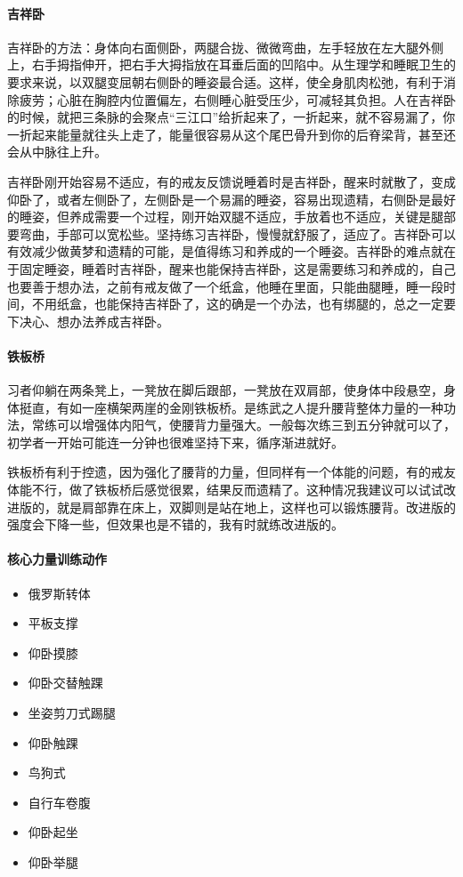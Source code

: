 \paragraph{吉祥卧}

吉祥卧的方法：身体向右面侧卧，两腿合拢、微微弯曲，左手轻放在左大腿外侧上，右手拇指伸开，把右手大拇指放在耳垂后面的凹陷中。从生理学和睡眠卫生的要求来说，以双腿变屈朝右侧卧的睡姿最合适。这样，使全身肌肉松弛，有利于消除疲劳；心脏在胸腔内位置偏左，右侧睡心脏受压少，可减轻其负担。人在吉祥卧的时候，就把三条脉的会聚点“三江口”给折起来了，一折起来，就不容易漏了，你一折起来能量就往头上走了，能量很容易从这个尾巴骨升到你的后脊梁背，甚至还会从中脉往上升。

吉祥卧刚开始容易不适应，有的戒友反馈说睡着时是吉祥卧，醒来时就散了，变成仰卧了，或者左侧卧了，左侧卧是一个易漏的睡姿，容易出现遗精，右侧卧是最好的睡姿，但养成需要一个过程，刚开始双腿不适应，手放着也不适应，关键是腿部要弯曲，手部可以宽松些。坚持练习吉祥卧，慢慢就舒服了，适应了。吉祥卧可以有效减少做黄梦和遗精的可能，是值得练习和养成的一个睡姿。吉祥卧的难点就在于固定睡姿，睡着时吉祥卧，醒来也能保持吉祥卧，这是需要练习和养成的，自己也要善于想办法，之前有戒友做了一个纸盒，他睡在里面，只能曲腿睡，睡一段时间，不用纸盒，也能保持吉祥卧了，这的确是一个办法，也有绑腿的，总之一定要下决心、想办法养成吉祥卧。

\paragraph{铁板桥}

习者仰躺在两条凳上，一凳放在脚后跟部，一凳放在双肩部，使身体中段悬空，身体挺直，有如一座横架两崖的金刚铁板桥。是练武之人提升腰背整体力量的一种功法，常练可以增强体内阳气，使腰背力量强大。一般每次练三到五分钟就可以了，初学者一开始可能连一分钟也很难坚持下来，循序渐进就好。

铁板桥有利于控遗，因为强化了腰背的力量，但同样有一个体能的问题，有的戒友体能不行，做了铁板桥后感觉很累，结果反而遗精了。这种情况我建议可以试试改进版的，就是肩部靠在床上，双脚则是站在地上，这样也可以锻炼腰背。改进版的强度会下降一些，但效果也是不错的，我有时就练改进版的。

\paragraph{核心力量训练动作}

\begin{multicols}{3}
    \begin{itemize}
        \item 俄罗斯转体
        \item 平板支撑
        \item 仰卧摸膝
        \item 仰卧交替触踝
        \item 坐姿剪刀式踢腿
        \item 仰卧触踝
        \item 鸟狗式
        \item 自行车卷腹
        \item 仰卧起坐
        \item 仰卧举腿
    \end{itemize}
\end{multicols}

